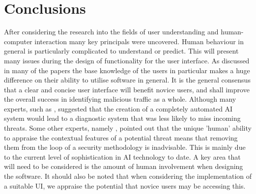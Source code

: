 \section{Conclusions} 
 
 After considering the research into the fields of user understanding and human-computer interaction many key principals were uncovered. Human behaviour in general is particularly complicated to understand or predict. This will present many issues during the design of functionality for the user interface. As discussed in many of the papers the base knowledge of the users in particular makes a huge difference on their ability to utilise software in general. It is the general consensus that a clear and concise user interface will benefit novice users, and shall improve the overall success in identifying malicious traffic as a whole. Although many experts, such as \citeauthor{cranor2008framework}, suggested that the creation of a completely automated AI system would lead to a diagnostic system that was less likely to miss incoming threats. Some other experts, namely \citeauthor{TargetedCyberSecurity}, pointed out that the unique 'human' ability to appraise the contextual features of a potential threat means that removing them from the loop of a security methodology is inadvisable. This is mainly due to the current level of sophistication in AI technology to date. A key area that will need to be considered is the amount of human involvement when designing the software. It should also be noted that when considering the implementation of a suitable UI, we appraise the potential that novice users may be accessing this.
 
 